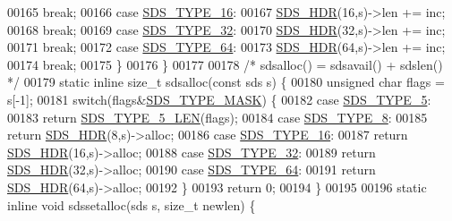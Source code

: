 \begin{DoxyCode}
00165             \textcolor{keywordflow}{break};
00166         \textcolor{keywordflow}{case} \hyperlink{sds_8h_aa54044bf70a30824caeb1bab3615bff2}{SDS\_TYPE\_16}:
00167             \hyperlink{sds_8h_a0f1b0d97d094e8505c1d46f95c6cbc30}{SDS\_HDR}(16,s)->len += inc;
00168             \textcolor{keywordflow}{break};
00169         \textcolor{keywordflow}{case} \hyperlink{sds_8h_a0ad2103bbdaa2fe5511ce3279cb42293}{SDS\_TYPE\_32}:
00170             \hyperlink{sds_8h_a0f1b0d97d094e8505c1d46f95c6cbc30}{SDS\_HDR}(32,s)->len += inc;
00171             \textcolor{keywordflow}{break};
00172         \textcolor{keywordflow}{case} \hyperlink{sds_8h_ad03c6e0fdab3a871e10cce347e8bb4e6}{SDS\_TYPE\_64}:
00173             \hyperlink{sds_8h_a0f1b0d97d094e8505c1d46f95c6cbc30}{SDS\_HDR}(64,s)->len += inc;
00174             \textcolor{keywordflow}{break};
00175     \}
00176 \}
00177 
00178 \textcolor{comment}{/* sdsalloc() = sdsavail() + sdslen() */}
00179 \textcolor{keyword}{static} \textcolor{keyword}{inline} size\_t sdsalloc(\textcolor{keyword}{const} sds s) \{
00180     \textcolor{keywordtype}{unsigned} \textcolor{keywordtype}{char} flags = s[-1];
00181     \textcolor{keywordflow}{switch}(flags&\hyperlink{sds_8h_a07564783f389fdd7772a8f61d55d9ddf}{SDS\_TYPE\_MASK}) \{
00182         \textcolor{keywordflow}{case} \hyperlink{sds_8h_a3b7b67f1efa75f6b78ae18ea853b1a91}{SDS\_TYPE\_5}:
00183             \textcolor{keywordflow}{return} \hyperlink{sds_8h_a387aebc42becc7d798cd1a33533da2de}{SDS\_TYPE\_5\_LEN}(flags);
00184         \textcolor{keywordflow}{case} \hyperlink{sds_8h_a504136356f04bfa2fd616dd4c8fdd71c}{SDS\_TYPE\_8}:
00185             \textcolor{keywordflow}{return} \hyperlink{sds_8h_a0f1b0d97d094e8505c1d46f95c6cbc30}{SDS\_HDR}(8,s)->alloc;
00186         \textcolor{keywordflow}{case} \hyperlink{sds_8h_aa54044bf70a30824caeb1bab3615bff2}{SDS\_TYPE\_16}:
00187             \textcolor{keywordflow}{return} \hyperlink{sds_8h_a0f1b0d97d094e8505c1d46f95c6cbc30}{SDS\_HDR}(16,s)->alloc;
00188         \textcolor{keywordflow}{case} \hyperlink{sds_8h_a0ad2103bbdaa2fe5511ce3279cb42293}{SDS\_TYPE\_32}:
00189             \textcolor{keywordflow}{return} \hyperlink{sds_8h_a0f1b0d97d094e8505c1d46f95c6cbc30}{SDS\_HDR}(32,s)->alloc;
00190         \textcolor{keywordflow}{case} \hyperlink{sds_8h_ad03c6e0fdab3a871e10cce347e8bb4e6}{SDS\_TYPE\_64}:
00191             \textcolor{keywordflow}{return} \hyperlink{sds_8h_a0f1b0d97d094e8505c1d46f95c6cbc30}{SDS\_HDR}(64,s)->alloc;
00192     \}
00193     \textcolor{keywordflow}{return} 0;
00194 \}
00195 
00196 \textcolor{keyword}{static} \textcolor{keyword}{inline} \textcolor{keywordtype}{void} sdssetalloc(sds s, size\_t newlen) \{

\end{DoxyCode}

